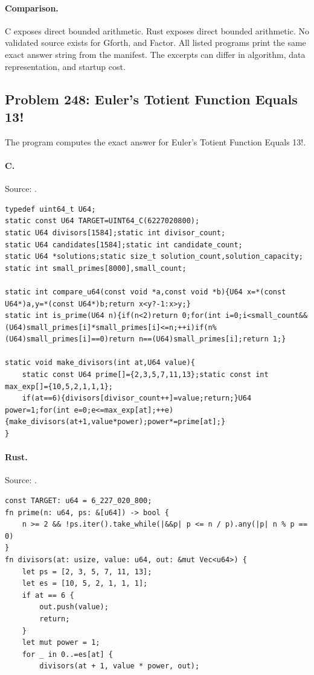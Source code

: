 \paragraph{Comparison.}
C exposes direct bounded arithmetic. Rust exposes direct bounded arithmetic.
No validated source exists for Gforth, and Factor.
All listed programs print the same exact answer string from the manifest. The excerpts can differ in algorithm, data representation, and startup cost.

\subsection{Problem 248: Euler's Totient Function Equals 13!}
\label{walkthrough:p248}
The program computes the exact answer for Euler's Totient Function Equals 13!.

\paragraph{C.} Source: .
\begin{lstlisting}
typedef uint64_t U64;
static const U64 TARGET=UINT64_C(6227020800);
static U64 divisors[1584];static int divisor_count;
static U64 candidates[1584];static int candidate_count;
static U64 *solutions;static size_t solution_count,solution_capacity;
static int small_primes[8000],small_count;

static int compare_u64(const void *a,const void *b){U64 x=*(const U64*)a,y=*(const U64*)b;return x<y?-1:x>y;}
static int is_prime(U64 n){if(n<2)return 0;for(int i=0;i<small_count&&(U64)small_primes[i]*small_primes[i]<=n;++i)if(n%(U64)small_primes[i]==0)return n==(U64)small_primes[i];return 1;}

static void make_divisors(int at,U64 value){
    static const U64 prime[]={2,3,5,7,11,13};static const int max_exp[]={10,5,2,1,1,1};
    if(at==6){divisors[divisor_count++]=value;return;}U64 power=1;for(int e=0;e<=max_exp[at];++e){make_divisors(at+1,value*power);power*=prime[at];}
}
\end{lstlisting}

\paragraph{Rust.} Source: .
\begin{lstlisting}
const TARGET: u64 = 6_227_020_800;
fn prime(n: u64, ps: &[u64]) -> bool {
    n >= 2 && !ps.iter().take_while(|&&p| p <= n / p).any(|p| n % p == 0)
}
fn divisors(at: usize, value: u64, out: &mut Vec<u64>) {
    let ps = [2, 3, 5, 7, 11, 13];
    let es = [10, 5, 2, 1, 1, 1];
    if at == 6 {
        out.push(value);
        return;
    }
    let mut power = 1;
    for _ in 0..=es[at] {
        divisors(at + 1, value * power, out);
\end{lstlisting}

